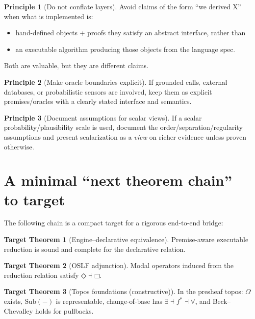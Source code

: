 \documentclass[11pt]{article}
\newcommand{\Sub}{\mathrm{Sub}}
\newcommand{\DiamondOp}{\mathbin{\Diamond}}
\newcommand{\BoxOp}{\mathbin{\Box}}
\theoremstyle{definition}
\newtheorem{principle}{Principle}
\newtheorem{goal}{Target Theorem}
\begin{document}
\begin{principle}[Do not conflate layers]
Avoid claims of the form ``we derived X'' when what is implemented is:
\begin{itemize}[leftmargin=1.5em]
\item hand-defined objects + proofs they satisfy an abstract interface, rather than
\item an executable algorithm producing those objects from the language spec.
\end{itemize}
Both are valuable, but they are different claims.
\end{principle}

\begin{principle}[Make oracle boundaries explicit]
If grounded calls, external databases, or probabilistic sensors are involved,
keep them as explicit premises/oracles with a clearly stated interface and semantics.
\end{principle}

\begin{principle}[Document assumptions for scalar views]
If a scalar probability/plausibility scale is used, document the order/separation/regularity assumptions
and present scalarization as a \emph{view} on richer evidence unless proven otherwise.
\end{principle}

\section{A minimal ``next theorem chain'' to target}

The following chain is a compact target for a rigorous end-to-end bridge:

\begin{goal}[Engine--declarative equivalence]
Premise-aware executable reduction is sound and complete for the declarative relation.
\end{goal}

\begin{goal}[OSLF adjunction]
Modal operators induced from the reduction relation satisfy $\DiamondOp \dashv \BoxOp$.
\end{goal}

\begin{goal}[Topos foundations (constructive)]
In the presheaf topos: $\Omega$ exists, $\Sub(-)$ is representable,
change-of-base has $\exists \dashv f^* \dashv \forall$, and Beck--Chevalley holds for pullbacks.
\end{goal}
\end{document}

